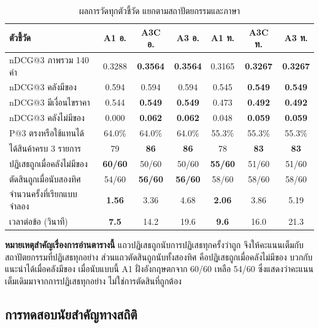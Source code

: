 \begin{table}[H]
\centering
\caption{ผลการวัดทุกตัวชี้วัด แยกตามสถาปัตยกรรมและภาษา}
\label{tab:results_all}
\small
\begin{tabular}{|p{4.4cm}|c|c|c|c|c|c|}
\hline
\textbf{ตัวชี้วัด} & \textbf{A1 อ.} & \textbf{A3C อ.} & \textbf{A3 อ.} & \textbf{A1 ท.} & \textbf{A3C ท.} & \textbf{A3 ท.} \\
\hline
nDCG@3 ภาพรวม 140 คำ & 0.3288 & \textbf{0.3564} & \textbf{0.3564} & 0.3165 & \textbf{0.3267} & \textbf{0.3267} \\ \hline
nDCG@3 คลังมีของ & 0.594 & 0.594 & 0.594 & 0.545 & \textbf{0.549} & \textbf{0.549} \\ \hline
nDCG@3 มีเงื่อนไขราคา & 0.544 & \textbf{0.549} & \textbf{0.549} & 0.473 & \textbf{0.492} & \textbf{0.492} \\ \hline
nDCG@3 คลังไม่มีของ & 0.000 & \textbf{0.062} & \textbf{0.062} & 0.048 & \textbf{0.059} & \textbf{0.059} \\ \hline
P@3 ตรงหรือใช้แทนได้ & 64.0\% & 64.0\% & 64.0\% & 55.3\% & 55.3\% & 55.3\% \\ \hline
ได้สินค้าครบ 3 รายการ & 79 & \textbf{86} & \textbf{86} & 78 & \textbf{83} & \textbf{83} \\ \hline
ปฏิเสธถูกเมื่อคลังไม่มีของ & \textbf{60/60} & 50/60 & 50/60 & \textbf{55/60} & 51/60 & 51/60 \\ \hline
ตัดสินถูกเมื่อนับสองทิศ & 54/60 & \textbf{56/60} & \textbf{56/60} & 58/60 & 58/60 & 58/60 \\ \hline
จำนวนครั้งที่เรียกแบบจำลอง & \textbf{1.56} & 3.36 & 4.68 & \textbf{2.06} & 3.86 & 5.19 \\ \hline
เวลาต่อข้อ (วินาที) & \textbf{7.5} & 14.2 & 19.6 & \textbf{9.6} & 16.0 & 21.3 \\
\hline
\end{tabular}
\end{table}

\textbf{หมายเหตุสำคัญเรื่องการอ่านตารางนี้} แถวปฏิเสธถูกนับการปฏิเสธทุกครั้งว่าถูก จึงให้คะแนนเต็มกับสถาปัตยกรรมที่ปฏิเสธทุกอย่าง ส่วนแถวตัดสินถูกนับทั้งสองทิศ คือปฏิเสธถูกเมื่อคลังไม่มีของ บวกกับแนะนำได้เมื่อคลังมีของ เมื่อนับแบบนี้ A1 ฝั่งอังกฤษตกจาก 60/60 เหลือ 54/60 ซึ่งแสดงว่าคะแนนเต็มเดิมมาจากการปฏิเสธทุกอย่าง ไม่ใช่การตัดสินที่ถูกต้อง

\subsection{การทดสอบนัยสำคัญทางสถิติ}

